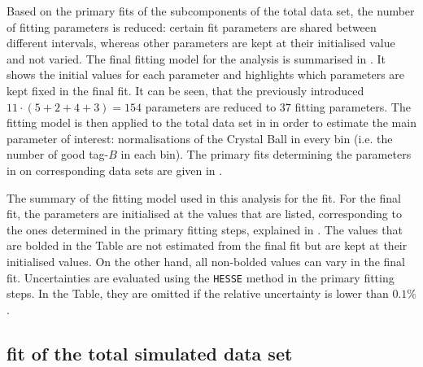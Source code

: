 Based on the primary fits of the subcomponents of the total data set, the number of fitting parameters is reduced:
certain fit parameters are shared between different \EB intervals, whereas other parameters are kept at their initialised value and not varied.
The final \Mbc fitting model for the analysis is summarised in .
It shows the initial values for each parameter and highlights which parameters are kept fixed in the final \Mbc fit.
It can be seen, that the previously introduced $11\cdot(5+2+4+3)=154$ parameters are reduced to $37$ fitting parameters.
The fitting model is then applied to the total data set in  
in order to estimate the main parameter of interest: 
normalisations of the Crystal Ball in every \EB bin (i.e. the number of good tag-$B$ in each \EB bin).
The primary \Mbc fits determining the parameters in 
 on corresponding data sets are given in . 
\begin{table}[hbtp!]
    \centering
    \caption{\label{tab:fitting_init_params} 
    The summary of the fitting model used in this analysis for the \Mbc fit.
    For the final \Mbc fit, the parameters are initialised at the values that are listed, corresponding to the ones determined in the primary fitting steps, explained in .
    The values that are bolded in the Table are not estimated from the final \Mbc fit but are kept at their initialised values.
    On the other hand, all non-bolded values can vary in the final fit.
    Uncertainties are evaluated using the \texttt{HESSE} method in the primary fitting steps.
    In the Table, they are omitted if the relative uncertainty is lower than $0.1\%$.
    }

\end{table}

\subsection{\texorpdfstring{\Mbc}{Mbc} fit of the total simulated data set}\label{sec:mbc_fit_full_mc}

